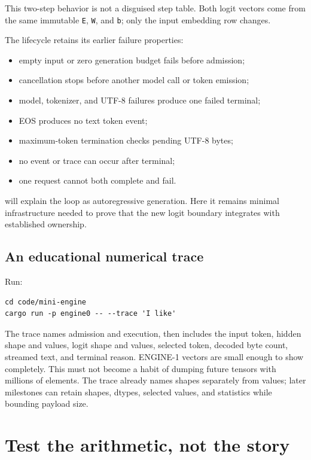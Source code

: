 This two-step behavior is not a disguised step table. Both logit vectors
come from the same immutable \texttt{E}, \texttt{W}, and \texttt{b};
only the input embedding row changes.

The lifecycle retains its earlier failure properties:

\begin{itemize}
\tightlist
\item
  empty input or zero generation budget fails before admission;
\item
  cancellation stops before another model call or token emission;
\item
  model, tokenizer, and UTF-8 failures produce one failed terminal;
\item
  EOS produces no text token event;
\item
  maximum-token termination checks pending UTF-8 bytes;
\item
  no event or trace can occur after terminal;
\item
  one request cannot both complete and fail.
\end{itemize}

 will explain the loop as autoregressive generation. Here it
remains minimal infrastructure needed to prove that the new logit
boundary integrates with established ownership.

\subsection{An educational numerical
trace}\label{an-educational-numerical-trace}

Run:

\begin{verbatim}
cd code/mini-engine
cargo run -p engine0 -- --trace 'I like'
\end{verbatim}

The trace names admission and execution, then includes the input token,
hidden shape and values, logit shape and values, selected token, decoded
byte count, streamed text, and terminal reason. ENGINE-1 vectors are
small enough to show completely. This must not become a habit of dumping
future tensors with millions of elements. The trace already names shapes
separately from values; later milestones can retain shapes, dtypes,
selected values, and statistics while bounding payload size.

\section{Test the arithmetic, not the
story}\label{test-the-arithmetic-not-the-story}

